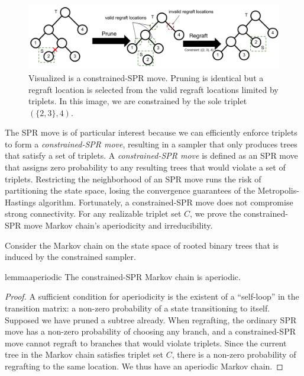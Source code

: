 \begin{figure}[htp!]
    \centering
    \includegraphics[width=\textwidth]{img/ibhc/ConstrainedSPRMove}
    \caption{
            Visualized is a constrained-SPR move.
            Pruning is identical  but
            a regraft location is selected from the valid regraft locations
            limited by triplets.
            In this image, we are constrained by the sole triplet $(\{2, 3\}, 4)$.
            }
    \label{fig:constrainedsprmove}
\end{figure}

The SPR move is of particular interest
because we can efficiently
enforce triplets to form a \emph{constrained-SPR move},
resulting in a sampler
that only produces trees that satisfy a set of triplets.
A \emph{constrained-SPR move} is defined as
an SPR move that assigns zero probability to
any resulting trees that would violate a set of triplets.
Restricting the neighborhood of an SPR move
runs the risk of partitioning the state space,
losing the convergence
guarantees of the Metropolis-Hastings algorithm.
Fortunately, a constrained-SPR move does not compromise
strong connectivity.
For any realizable triplet set $C$,
we prove 
the constrained-SPR move Markov chain's aperiodicity and irreducibility.

Consider the Markov chain on the state space 
of rooted binary trees that is induced by the constrained sampler.
\begin{restatable}{lemma}{aperiodic}
The constrained-SPR Markov chain is aperiodic.
\end{restatable}
\begin{proof}
A sufficient condition for aperiodicity
is the existent of a ``self-loop'' in the transition matrix: a non-zero probability of a state transitioning to itself.
Supposed we have pruned a subtree already.
When regrafting, the ordinary SPR move
has a non-zero probability of choosing any branch,
and a constrained-SPR move cannot regraft
to branches that would violate triplets.
Since the current tree in the Markov chain
satisfies triplet set $C$, there is a non-zero probability
of regrafting to the same location. 
We thus have an aperiodic Markov chain.
\end{proof}



